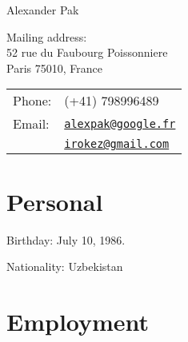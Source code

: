\documentclass[letterpaper]{article}
\def\name{Alexander Pak}
\renewenvironment{itemize}{
  \begin{list}{}{
    \setlength{\leftmargin}{0.6em}
  }
}{
  \end{list}
}
\begin{document}
{\huge \name}


\vspace{0.25in}

\begin{minipage}{0.45\linewidth}
	Mailing address:\\
	52 rue du Faubourg Poissonniere \\
	Paris 75010, France
\end{minipage}
\begin{minipage}{0.45\linewidth}
  \begin{tabular}{ll}
    Phone: & (+41) 798996489 \\
    Email: & \href{mailto:alexpak@limsi.fr}{\tt alexpak@google.fr}\\
	       & \href{mailto:irokez@gmail.com}{\tt irokez@gmail.com}
  \end{tabular}
\end{minipage}

\section*{Personal}

\begin{itemize}
\item Birthday: July 10, 1986.
\item Nationality: Uzbekistan
\end{itemize}


\section*{Employment}
\end{document}
